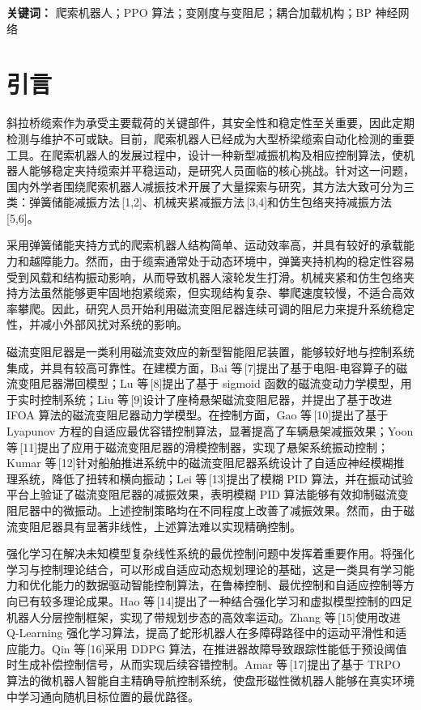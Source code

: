 \documentclass[12pt,a4paper]{ctexart}
\begin{document}
\noindent\textbf{关键词：} 爬索机器人；PPO 算法；变刚度与变阻尼；耦合加载机构；BP 神经网络

\section{引言}
斜拉桥缆索作为承受主要载荷的关键部件，其安全性和稳定性至关重要，因此定期检测与维护不可或缺。目前，爬索机器人已经成为大型桥梁缆索自动化检测的重要工具。在爬索机器人的发展过程中，设计一种新型减振机构及相应控制算法，使机器人能够稳定夹持缆索并平稳运动，是研究人员面临的核心挑战。针对这一问题，国内外学者围绕爬索机器人减振技术开展了大量探索与研究，其方法大致可分为三类：弹簧储能减振方法\,[1,2]、机械夹紧减振方法\,[3,4]和仿生包络夹持减振方法\,[5,6]。

采用弹簧储能夹持方式的爬索机器人结构简单、运动效率高，并具有较好的承载能力和越障能力。然而，由于缆索通常处于动态环境中，弹簧夹持机构的稳定性容易受到风载和结构振动影响，从而导致机器人滚轮发生打滑。机械夹紧和仿生包络夹持方法虽然能够更牢固地抱紧缆索，但实现结构复杂、攀爬速度较慢，不适合高效率攀爬。因此，研究人员开始利用磁流变阻尼器连续可调的阻尼力来提升系统稳定性，并减小外部风扰对系统的影响。

磁流变阻尼器是一类利用磁流变效应的新型智能阻尼装置，能够较好地与控制系统集成，并具有较高可靠性。在建模方面，Bai 等\,[7]提出了基于电阻-电容算子的磁流变阻尼器滞回模型；Lu 等\,[8]提出了基于 sigmoid 函数的磁流变动力学模型，用于实时控制系统；Liu 等\,[9]设计了座椅悬架磁流变阻尼器，并提出了基于改进 IFOA 算法的磁流变阻尼器动力学模型。在控制方面，Gao 等\,[10]提出了基于 Lyapunov 方程的自适应最优容错控制算法，显著提高了车辆悬架减振效果；Yoon 等\,[11]提出了应用于磁流变阻尼器的滑模控制器，实现了悬架系统振动控制；Kumar 等\,[12]针对船舶推进系统中的磁流变阻尼器系统设计了自适应神经模糊推理系统，降低了扭转和横向振动；Lei 等\,[13]提出了模糊 PID 算法，并在振动试验平台上验证了磁流变阻尼器的减振效果，表明模糊 PID 算法能够有效抑制磁流变阻尼器中的微振动。上述控制策略均在不同程度上改善了减振效果。然而，由于磁流变阻尼器具有显著非线性，上述算法难以实现精确控制。

强化学习在解决未知模型复杂线性系统的最优控制问题中发挥着重要作用。将强化学习与控制理论结合，可以形成自适应动态规划理论的基础，这是一类具有学习能力和优化能力的数据驱动智能控制算法，在鲁棒控制、最优控制和自适应控制等方向已有较多理论成果。Hao 等\,[14]提出了一种结合强化学习和虚拟模型控制的四足机器人分层控制框架，实现了带规划步态的高效率运动。Zhang 等\,[15]使用改进 Q-Learning 强化学习算法，提高了蛇形机器人在多障碍路径中的运动平滑性和适应能力。Qin 等\,[16]采用 DDPG 算法，在推进器故障导致跟踪性能低于预设阈值时生成补偿控制信号，从而实现后续容错控制。Amar 等\,[17]提出了基于 TRPO 算法的微机器人智能自主精确导航控制系统，使盘形磁性微机器人能够在真实环境中学习通向随机目标位置的最优路径。
\end{document}
